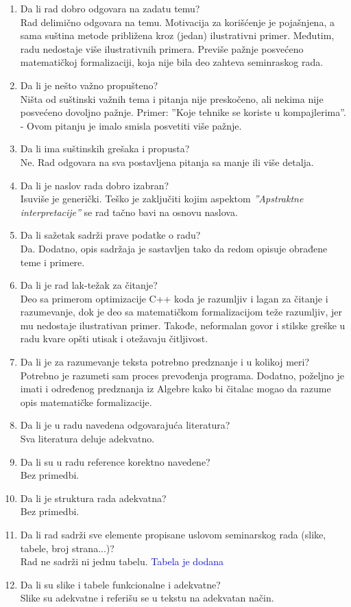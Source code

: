 \documentclass[a4paper]{report}
\newcommand{\odgovor}[1]{\textcolor{blue}{#1}}
\begin{document}
\begin{enumerate}
\item Da li rad dobro odgovara na zadatu temu?\\
Rad delimično odgovara na temu. Motivacija za korišćenje je pojašnjena, a sama suština metode približena kroz (jedan) ilustrativni primer. 
Međutim, radu nedostaje više ilustrativnih primera. Previše pažnje posvećeno matematičkoj formalizaciji, koja nije bila deo zahteva seminraskog rada.
\item Da li je nešto važno propušteno?\\
Ništa od suštinski važnih tema i pitanja nije preskočeno, ali nekima nije posvećeno dovoljno pažnje. Primer: ''Koje tehnike se koriste u kompajlerima''. - Ovom pitanju je imalo smisla posvetiti više pažnje.
\item Da li ima suštinskih grešaka i propusta?\\
Ne. Rad odgovara na sva postavljena pitanja sa manje ili više detalja. 
\item Da li je naslov rada dobro izabran?\\
Isuviše je generički. Teško je zaključiti kojim aspektom \emph{''Apstraktne interpretacije''} se rad tačno bavi na osnovu naslova.
\item Da li sažetak sadrži prave podatke o radu?\\
Da. Dodatno, opis sadržaja je sastavljen tako da redom opisuje obrađene teme i primere.
\item Da li je rad lak-težak za čitanje?\\
Deo sa primerom optimizacije C++ koda je razumljiv i lagan za čitanje i razumevanje, dok je deo sa matematičkom formalizacijom teže razumljiv, jer mu nedostaje ilustrativan primer. Takođe, neformalan govor i stilske greške u radu kvare opšti utisak i otežavaju čitljivost.
\item Da li je za razumevanje teksta potrebno predznanje i u kolikoj meri?\\
Potrebno je razumeti sam proces prevođenja programa. Dodatno, poželjno je imati i određenog predznanja iz Algebre kako bi čitalac mogao da razume opis matematičke formalizacije.
\item Da li je u radu navedena odgovarajuća literatura?\\
Sva literatura deluje adekvatno.
\item Da li su u radu reference korektno navedene?\\
Bez primedbi.
\item Da li je struktura rada adekvatna?\\
Bez primedbi.
\item Da li rad sadrži sve elemente propisane uslovom seminarskog rada (slike, tabele, broj strana...)?\\
Rad ne sadrži ni jednu tabelu.
\odgovor{Tabela je dodana}
\item Da li su slike i tabele funkcionalne i adekvatne?\\
Slike su adekvatne i referišu se u tekstu na adekvatan način. 
\end{enumerate}
\end{document}
